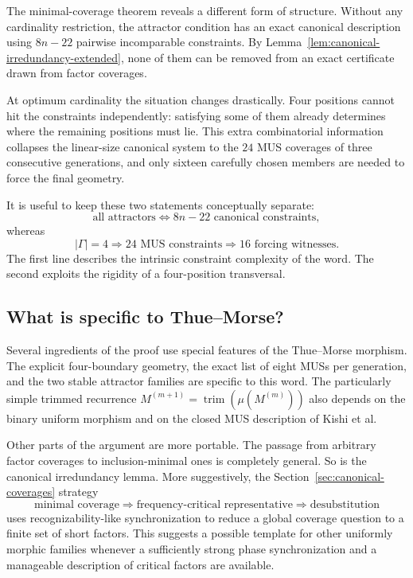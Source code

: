 \documentclass[10pt,a4paper]{article}
\theoremstyle{definition}\newtheorem{definition}[theorem]{Definition}
\theoremstyle{remark}\newtheorem{remark}[theorem]{Remark}
\begin{document}
The minimal-coverage theorem reveals a different form of structure.  Without any cardinality restriction, the attractor condition has an exact canonical description using
$
 8n-22
$
pairwise incomparable constraints.  By Lemma~\ref{lem:canonical-irredundancy-extended}, none of them can be removed from an exact certificate drawn from factor coverages.

At optimum cardinality the situation changes drastically.  Four positions cannot hit the constraints independently: satisfying some of them already determines where the remaining positions must lie.  This extra combinatorial information collapses the linear-size canonical system to the $24$ MUS coverages of three consecutive generations, and only sixteen carefully chosen members are needed to force the final geometry.

It is useful to keep these two statements conceptually separate:
\[
 \boxed{\text{all attractors}}
 \Longleftrightarrow
 \boxed{8n-22\text{ canonical constraints}},
\]
whereas
\[
 \boxed{|\Gamma|=4}
 \Longrightarrow
 \boxed{24\text{ MUS constraints}}
 \Longrightarrow
 \boxed{16\text{ forcing witnesses}}.
\]
The first line describes the intrinsic constraint complexity of the word.  The second exploits the rigidity of a four-position transversal.

\subsection{What is specific to Thue--Morse?}
\label{subsec:specific-vs-portable}

Several ingredients of the proof use special features of the Thue--Morse morphism.  The explicit four-boundary geometry, the exact list of eight MUSs per generation, and the two stable attractor families are specific to this word.  The particularly simple trimmed recurrence
$
 M^{(m+1)}=\operatorname{trim}(\mu(M^{(m)}))
$
also depends on the binary uniform morphism and on the closed MUS description of Kishi et al.

Other parts of the argument are more portable.  The passage from arbitrary factor coverages to inclusion-minimal ones is completely general.  So is the canonical irredundancy lemma.  More suggestively, the Section~\ref{sec:canonical-coverages} strategy
\[
 \text{minimal coverage}
 \Rightarrow
 \text{frequency-critical representative}
 \Rightarrow
 \text{desubstitution}
\]
uses recognizability-like synchronization to reduce a global coverage question to a finite set of short factors.  This suggests a possible template for other uniformly morphic families whenever a sufficiently strong phase synchronization and a manageable description of critical factors are available.
\end{document}
